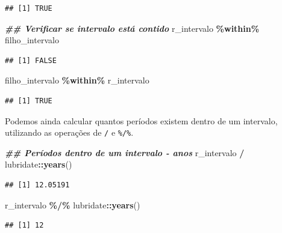 \documentclass[
]{article}
\newenvironment{Shaded}{\begin{snugshade}}{\end{snugshade}}
\newcommand{\DocumentationTok}[1]{\textcolor[rgb]{0.56,0.35,0.01}{\textbf{\textit{#1}}}}
\newcommand{\FunctionTok}[1]{\textcolor[rgb]{0.13,0.29,0.53}{\textbf{#1}}}
\newcommand{\NormalTok}[1]{#1}
\newcommand{\SpecialCharTok}[1]{\textcolor[rgb]{0.81,0.36,0.00}{\textbf{#1}}}
\begin{document}
\begin{verbatim}
## [1] TRUE
\end{verbatim}

\begin{Shaded}
\begin{Highlighting}[]
\DocumentationTok{\#\# Verificar se intervalo está contido}
\NormalTok{r\_intervalo }\SpecialCharTok{\%within\%}\NormalTok{ filho\_intervalo}
\end{Highlighting}
\end{Shaded}

\begin{verbatim}
## [1] FALSE
\end{verbatim}

\begin{Shaded}
\begin{Highlighting}[]
\NormalTok{filho\_intervalo }\SpecialCharTok{\%within\%}\NormalTok{ r\_intervalo}
\end{Highlighting}
\end{Shaded}

\begin{verbatim}
## [1] TRUE
\end{verbatim}

Podemos ainda calcular quantos períodos existem dentro de um intervalo, utilizando as operações de \texttt{/} e \texttt{\%/\%}.

\begin{Shaded}
\begin{Highlighting}[]
\DocumentationTok{\#\# Períodos dentro de um intervalo {-} anos}
\NormalTok{r\_intervalo }\SpecialCharTok{/}\NormalTok{ lubridate}\SpecialCharTok{::}\FunctionTok{years}\NormalTok{()}
\end{Highlighting}
\end{Shaded}

\begin{verbatim}
## [1] 12.05191
\end{verbatim}

\begin{Shaded}
\begin{Highlighting}[]
\NormalTok{r\_intervalo }\SpecialCharTok{\%/\%}\NormalTok{ lubridate}\SpecialCharTok{::}\FunctionTok{years}\NormalTok{()}
\end{Highlighting}
\end{Shaded}

\begin{verbatim}
## [1] 12
\end{verbatim}
\end{document}
